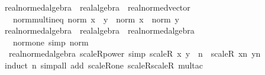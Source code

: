 \begin{isabellebody}
\isanewline
\isanewline
{}\isamarkupfalse%
\ real{\isacharunderscore}{\kern0pt}normed{\isacharunderscore}{\kern0pt}algebra\ {\isacharequal}{\kern0pt}\ real{\isacharunderscore}{\kern0pt}algebra\ {\isacharplus}{\kern0pt}\ real{\isacharunderscore}{\kern0pt}normed{\isacharunderscore}{\kern0pt}vector\ {\isacharplus}{\kern0pt}\isanewline
\ \ \ norm{\isacharunderscore}{\kern0pt}mult{\isacharunderscore}{\kern0pt}ineq{\isacharcolon}{\kern0pt}\ {\isachardoublequoteopen}norm\ {\isacharparenleft}{\kern0pt}x\ {\isacharasterisk}{\kern0pt}\ y{\isacharparenright}{\kern0pt}\ {\isasymle}\ norm\ x\ {\isacharasterisk}{\kern0pt}\ norm\ y{\isachardoublequoteclose}\isanewline
\isanewline
{}\isamarkupfalse%
\ real{\isacharunderscore}{\kern0pt}normed{\isacharunderscore}{\kern0pt}algebra{\isacharunderscore}{\kern0pt}{}\ {\isacharequal}{\kern0pt}\ real{\isacharunderscore}{\kern0pt}algebra{\isacharunderscore}{\kern0pt}{}\ {\isacharplus}{\kern0pt}\ real{\isacharunderscore}{\kern0pt}normed{\isacharunderscore}{\kern0pt}algebra\ {\isacharplus}{\kern0pt}\isanewline
\ \ \ norm{\isacharunderscore}{\kern0pt}one\ {\isacharbrackleft}{\kern0pt}simp{\isacharbrackright}{\kern0pt}{\isacharcolon}{\kern0pt}\ {\isachardoublequoteopen}norm\ {}\ {\isacharequal}{\kern0pt}\ {}{\isachardoublequoteclose}\isanewline
\isanewline
{}\isamarkupfalse%
\ {\isacharparenleft}{\kern0pt}\ real{\isacharunderscore}{\kern0pt}normed{\isacharunderscore}{\kern0pt}algebra{\isacharunderscore}{\kern0pt}{}{\isacharparenright}{\kern0pt}\ scaleR{\isacharunderscore}{\kern0pt}power\ {\isacharbrackleft}{\kern0pt}simp{\isacharbrackright}{\kern0pt}{\isacharcolon}{\kern0pt}\ {\isachardoublequoteopen}{\isacharparenleft}{\kern0pt}scaleR\ x\ y{\isacharparenright}{\kern0pt}\ {\isacharcircum}{\kern0pt}\ n\ {\isacharequal}{\kern0pt}\ scaleR\ {\isacharparenleft}{\kern0pt}x{\isacharcircum}{\kern0pt}n{\isacharparenright}{\kern0pt}\ {\isacharparenleft}{\kern0pt}y{\isacharcircum}{\kern0pt}n{\isacharparenright}{\kern0pt}{\isachardoublequoteclose}\isanewline
%
\isadelimproof
\ \ %
\endisadelimproof
%
\isatagproof
{}\isamarkupfalse%
\ {\isacharparenleft}{\kern0pt}induct\ n{\isacharparenright}{\kern0pt}\ {\isacharparenleft}{\kern0pt}simp{\isacharunderscore}{\kern0pt}all\ add{\isacharcolon}{\kern0pt}\ scaleR{\isacharunderscore}{\kern0pt}one\ scaleR{\isacharunderscore}{\kern0pt}scaleR\ mult{\isacharunderscore}{\kern0pt}ac{\isacharparenright}{\kern0pt}%
\endisatagproof
{\isafoldproof}%

\end{isabellebody}
